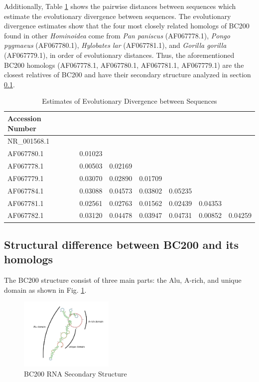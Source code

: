 \documentclass[conference, 11pt]{IEEEtran}
\begin{document}
Additionally, Table \ref{tbl:distances} shows the pairwise distances between sequences which estimate the evolutionary divergence between sequences. 
The evolutionary divergence estimates show that the four most closely related homologs of BC200 found in other \emph{Hominoidea} come from \emph{Pan paniscus} (AF067778.1), \emph{Pongo pygmaeus} (AF067780.1), \emph{Hylobates lar} (AF067781.1), and \emph{Gorilla gorilla} (AF067779.1), in order of evolutionary distances. 
Thus, the aforementioned BC200 homologs (AF067778.1, AF067780.1, AF067781.1, AF067779.1) are the closest relatives of BC200 and have their secondary structure analyzed in section \ref{sec:results-structure}.

\begin{table}[h]
  \centering
  \caption{Estimates of Evolutionary Divergence between Sequences}
  \label{tbl:distances}
  \begin{tabular}{lcccccc}
    \toprule
    Accession Number \\
    \midrule
    NR\_001568.1 \\
    AF067780.1 & 0.01023 \\
    AF067778.1 & 0.00503 & 0.02169 \\
    AF067779.1 & 0.03070 & 0.02890 & 0.01709 \\ 
    AF067784.1 & 0.03088 & 0.04573 & 0.03802 & 0.05235 \\
    AF067781.1 & 0.02561 & 0.02763 & 0.01562 & 0.02439 & 0.04353 \\ 
    AF067782.1 & 0.03120 & 0.04478 & 0.03947 & 0.04731 & 0.00852 & 0.04259 \\
    \bottomrule
  \end{tabular}
\end{table}

\subsection{Structural difference between BC200 and its homologs}\label{sec:results-structure}

The BC200 structure consist of three main parts: the Alu, A-rich, and unique domain \cite{jung2014rna} as shown in Fig. \ref{fig:bc200-structure}.

\begin{figure}[h]
  \centering
  \includegraphics[width=0.4\textwidth]{figs/rna-6.png}
  \caption{BC200 RNA Secondary Structure}
  \label{fig:bc200-structure}
\end{figure}
\end{document}
